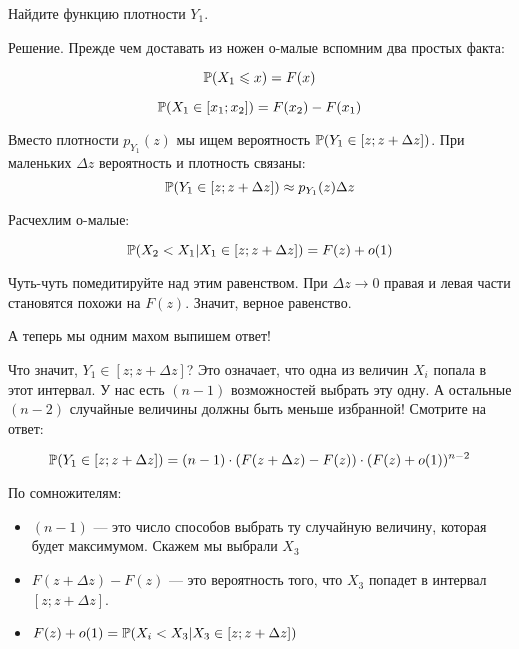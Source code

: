 \begin{myex} Найдите функцию плотности $ Y_{1} $.

Решение. Прежде чем доставать из ножен о-малые вспомним два простых факта:

\begin{equation}
\P(X_{1}\leq x)=F(x)
\end{equation}

\begin{equation}
\P(X_{1}\in [x_{1};x_{2}])=F(x_{2})-F(x_{1})
\end{equation}



Вместо плотности $ p_{Y_{1}}(z) $ мы ищем вероятность $ \P(Y_{1}\in [z;z+\Delta z]) $. При маленьких $ \Delta z $ вероятность и плотность связаны:
\begin{equation}
\P(Y_{1}\in [z;z+\Delta z])\approx p_{Y_{1}}(z)\Delta z
\end{equation}


Расчехлим о-малые:

\begin{equation}
\P(X_{2}<X_{1}|X_{1}\in [z;z+\Delta z])=F(z)+o(1)
\end{equation}

Чуть-чуть помедитируйте над этим равенством. При $ \Delta z\to 0 $ правая и левая части становятся похожи на $ F(z) $. Значит, верное равенство.

А теперь мы одним махом выпишем ответ!

Что значит, $ Y_{1}\in [z;z+\Delta z] $? Это означает, что одна из величин $ X_{i} $ попала в этот интервал. У нас есть $ (n-1) $ возможностей выбрать эту одну. А остальные $ (n-2) $ случайные величины должны быть меньше избранной! Смотрите на ответ:

\begin{equation}
\P(Y_{1}\in [z;z+\Delta z])=(n-1)\cdot (F(z+\Delta z)-F(z)) \cdot (F(z)+o(1))^{n-2}
\end{equation}

По сомножителям:
\begin{itemize}
\item $ (n-1) $ — это число способов выбрать ту случайную величину, которая будет максимумом. Скажем мы выбрали $ X_{3} $
\item $ F(z+\Delta z)-F(z) $ — это вероятность того, что $ X_{3} $ попадет в интервал $ [z;z+\Delta z] $.
\item $ F(z)+o(1)=\P(X_{i}<X_{3}|X_{3}\in [z;z+\Delta z]) $
\end{itemize}


\end{myex}
